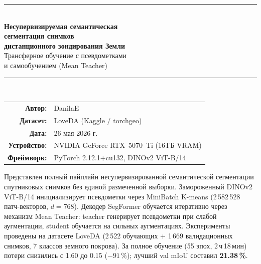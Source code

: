 \documentclass[11pt,a4paper]{article}
\begin{document}
\thispagestyle{empty}

\begin{center}
  \vspace*{1.5cm}
  {\color{mainblue}\rule{\textwidth}{2pt}}\\[0.6cm]
  {\Huge\bfseries\color{darkblue}
    Несупервизируемая семантическая\\[6pt]
    сегментация снимков\\[6pt]
    дистанционного зондирования Земли}\\[0.8cm]
  {\Large\color{mainblue}
    Трансферное обучение с псевдометками\\
    и самообучением (Mean Teacher)}\\[0.6cm]
  {\color{mainblue}\rule{\textwidth}{2pt}}\\[1.5cm]

  \begin{tabular}{rl}
    \textbf{Автор:}   & DanilaE \\[4pt]
    \textbf{Датасет:} & LoveDA (Kaggle / torchgeo) \\[4pt]
    \textbf{Дата:}    & 26 мая 2026 г. \\[4pt]
    \textbf{Устройство:} & NVIDIA GeForce RTX~5070~Ti (16\,ГБ VRAM) \\[4pt]
    \textbf{Фреймворк:} & PyTorch 2.12.1+cu132, DINOv2 ViT-B/14 \\
  \end{tabular}

  \vspace{1.8cm}

  \begin{minipage}{0.85\textwidth}
    \begin{tcolorbox}[colback=darkblue!8, colframe=darkblue, title=Аннотация, fonttitle=\bfseries]
      Представлен полный пайплайн несупервизированной семантической сегментации спутниковых
      снимков без единой размеченной выборки. Замороженный DINOv2 ViT-B/14 инициализирует
      псевдометки через MiniBatch K-means (2\,582\,528 патч-векторов, $d{=}768$).
      Декодер SegFormer обучается итеративно через механизм Mean Teacher:
      teacher генерирует псевдометки при слабой аугментации, student обучается на
      сильных аугментациях. Эксперименты проведены на датасете LoveDA (2\,522 обучающих
      + 1\,669 валидационных снимков, 7 классов земного покрова). За полное обучение
      (55 эпох, 2\,ч\,18\,мин) потери снизились с 1.60 до 0.15 ($-91\,\%$);
      лучший val mIoU составил \textbf{21.38\,\%}.
    \end{tcolorbox}
  \end{minipage}
\end{center}
\end{document}
